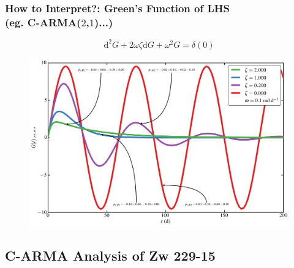 \documentclass[hyperref={pdfpagelabels=false}]{beamer}
\begin{document}

\begin{frame}
\frametitle{How to Interpret?: Green's Function of LHS\\(eg. C-ARMA($2$,$1$)...)}
  \begin{equation*}\label{eq:CARMAGF} \mathrm{d}^{2}G + 2\omega\zeta \mathrm{d}G + \omega^{2}G = \delta(0) \end{equation*}
  \begin{figure}
    \includegraphics[scale=0.06]{images/CARMA(2,1)_GF.jpg}
  \end{figure}
\end{frame}

\subsection{C-ARMA Analysis of Zw 229-15} 
\end{document}
